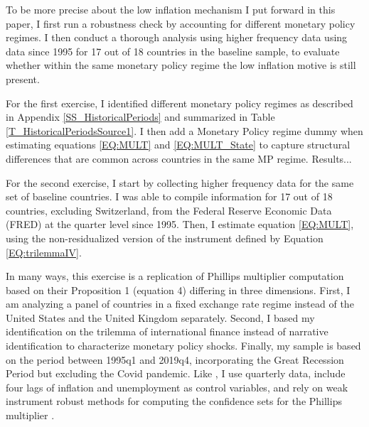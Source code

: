 \documentclass[12pt]{article}
\begin{document}
To be more precise about the low inflation mechanism I put forward in this paper, I first run a robustness check by accounting for different monetary policy regimes. I then conduct a thorough analysis using higher frequency data using data since 1995 for 17 out of 18 countries in the baseline sample, to evaluate whether within the same monetary policy regime the low inflation motive is still present.

For the first exercise, I identified different monetary policy regimes as described in Appendix \ref{SS_HistoricalPeriods} and summarized in Table \ref{T_HistoricalPeriodsSource1}. I then add a Monetary Policy regime dummy when estimating equations \eqref{EQ:MULT} and \eqref{EQ:MULT_State} to capture structural differences that are common across countries in the same MP regime. Results... 

For the second exercise, I start by collecting higher frequency data for the same set of baseline countries. I was able to compile information for 17 out of 18 countries, excluding Switzerland, from the Federal Reserve Economic Data (FRED) at the quarter level since 1995. Then, I estimate equation \eqref{EQ:MULT}, using the non-residualized version of the instrument defined by Equation \eqref{EQ:trilemmaIV}.

In many ways, this exercise is a replication of \cite{Barnichon2019} Phillips multiplier computation based on their Proposition 1 (equation 4) differing in three dimensions. First, I am analyzing a panel of countries in a fixed exchange rate regime instead of the United States and the United Kingdom separately. Second, I based my identification on the trilemma of international finance instead of narrative identification to characterize monetary policy shocks. Finally, my sample is based on the period between 1995q1 and 2019q4, incorporating the Great Recession Period but excluding the Covid pandemic. Like \cite{Barnichon2019}, I use quarterly data, include four lags of inflation and unemployment as control variables, and rely on weak instrument robust methods for computing the confidence sets for the Phillips multiplier \citep{Anderson1949}.
\end{document}
